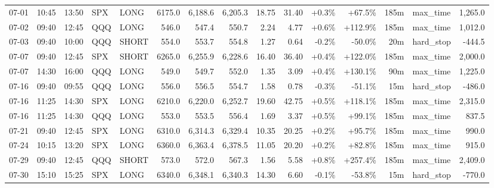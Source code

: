 \documentclass[11pt,a4paper,twoside]{article}
\begin{document}
\begin{landscape}
\begin{center}
\begin{longtable}{>{\color{txtmain}}l l l l l r r r r r r r r >{\color{txtmain}}l r}
07-01 & 10:45 & 13:50 & SPX & LONG & 6175.0 & 6,188.6 & 6,205.3 & 18.75 & 31.40 & \textcolor{wingreen}{+0.3\%} & \textcolor{wingreen}{+67.5\%} & 185m & max\_time & \textcolor{wingreen}{1,265.0} \\
07-02 & 09:40 & 12:45 & QQQ & LONG & 546.0 & 547.4 & 550.7 & 2.24 & 4.77 & \textcolor{wingreen}{+0.6\%} & \textcolor{wingreen}{+112.9\%} & 185m & max\_time & \textcolor{wingreen}{1,012.0} \\
07-03 & 09:40 & 10:00 & QQQ & SHORT & 554.0 & 553.7 & 554.8 & 1.27 & 0.64 & \textcolor{lossred}{-0.2\%} & \textcolor{lossred}{-50.0\%} & 20m & hard\_stop & \textcolor{lossred}{-444.5} \\
07-07 & 09:40 & 12:45 & SPX & SHORT & 6265.0 & 6,255.9 & 6,228.6 & 16.40 & 36.40 & \textcolor{wingreen}{+0.4\%} & \textcolor{wingreen}{+122.0\%} & 185m & max\_time & \textcolor{wingreen}{2,000.0} \\
07-07 & 14:30 & 16:00 & QQQ & LONG & 549.0 & 549.7 & 552.0 & 1.35 & 3.09 & \textcolor{wingreen}{+0.4\%} & \textcolor{wingreen}{+130.1\%} & 90m & max\_time & \textcolor{wingreen}{1,225.0} \\
07-16 & 09:40 & 09:55 & QQQ & LONG & 556.0 & 556.5 & 554.7 & 1.58 & 0.78 & \textcolor{lossred}{-0.3\%} & \textcolor{lossred}{-51.1\%} & 15m & hard\_stop & \textcolor{lossred}{-486.0} \\
07-16 & 11:25 & 14:30 & SPX & LONG & 6210.0 & 6,220.0 & 6,252.7 & 19.60 & 42.75 & \textcolor{wingreen}{+0.5\%} & \textcolor{wingreen}{+118.1\%} & 185m & max\_time & \textcolor{wingreen}{2,315.0} \\
07-16 & 11:25 & 14:30 & QQQ & LONG & 553.0 & 553.5 & 556.4 & 1.69 & 3.37 & \textcolor{wingreen}{+0.5\%} & \textcolor{wingreen}{+99.1\%} & 185m & max\_time & \textcolor{wingreen}{837.5} \\
07-21 & 09:40 & 12:45 & SPX & LONG & 6310.0 & 6,314.3 & 6,329.4 & 10.35 & 20.25 & \textcolor{wingreen}{+0.2\%} & \textcolor{wingreen}{+95.7\%} & 185m & max\_time & \textcolor{wingreen}{990.0} \\
07-24 & 10:15 & 13:20 & SPX & LONG & 6360.0 & 6,363.4 & 6,378.5 & 11.05 & 20.20 & \textcolor{wingreen}{+0.2\%} & \textcolor{wingreen}{+82.8\%} & 185m & max\_time & \textcolor{wingreen}{915.0} \\
07-29 & 09:40 & 12:45 & QQQ & SHORT & 573.0 & 572.0 & 567.3 & 1.56 & 5.58 & \textcolor{wingreen}{+0.8\%} & \textcolor{wingreen}{+257.4\%} & 185m & max\_time & \textcolor{wingreen}{2,409.0} \\
07-30 & 15:10 & 15:25 & SPX & LONG & 6340.0 & 6,348.1 & 6,340.3 & 14.30 & 6.60 & \textcolor{lossred}{-0.1\%} & \textcolor{lossred}{-53.8\%} & 15m & hard\_stop & \textcolor{lossred}{-770.0} \\

\end{longtable}
\end{center}
\end{landscape}
\end{document}

